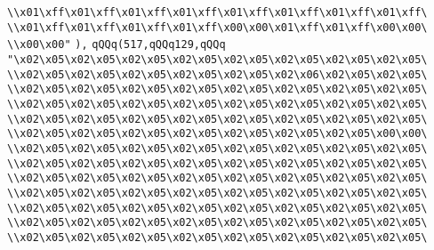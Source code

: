 \verb|\\x01\xff\x01\xff\x01\xff\x01\xff\x01\xff\x01\xff\x01\xff\x01\xff\|\newline
\verb|\\x01\xff\x01\xff\x01\xff\x01\xff\x00\x00\x01\xff\x01\xff\x00\x00\|\newline
\verb|\\x00\x00"|\newline
\verb|),|\newline
\verb|qQQq(517,qQQq129,qQQq|\newline
\verb|"\x02\x05\x02\x05\x02\x05\x02\x05\x02\x05\x02\x05\x02\x05\x02\x05\|\newline
\verb|\\x02\x05\x02\x05\x02\x05\x02\x05\x02\x05\x02\x06\x02\x05\x02\x05\|\newline
\verb|\\x02\x05\x02\x05\x02\x05\x02\x05\x02\x05\x02\x05\x02\x05\x02\x05\|\newline
\verb|\\x02\x05\x02\x05\x02\x05\x02\x05\x02\x05\x02\x05\x02\x05\x02\x05\|\newline
\verb|\\x02\x05\x02\x05\x02\x05\x02\x05\x02\x05\x02\x05\x02\x05\x02\x05\|\newline
\verb|\\x02\x05\x02\x05\x02\x05\x02\x05\x02\x05\x02\x05\x02\x05\x00\x00\|\newline
\verb|\\x02\x05\x02\x05\x02\x05\x02\x05\x02\x05\x02\x05\x02\x05\x02\x05\|\newline
\verb|\\x02\x05\x02\x05\x02\x05\x02\x05\x02\x05\x02\x05\x02\x05\x02\x05\|\newline
\verb|\\x02\x05\x02\x05\x02\x05\x02\x05\x02\x05\x02\x05\x02\x05\x02\x05\|\newline
\verb|\\x02\x05\x02\x05\x02\x05\x02\x05\x02\x05\x02\x05\x02\x05\x02\x05\|\newline
\verb|\\x02\x05\x02\x05\x02\x05\x02\x05\x02\x05\x02\x05\x02\x05\x02\x05\|\newline
\verb|\\x02\x05\x02\x05\x02\x05\x02\x05\x02\x05\x02\x05\x02\x05\x02\x05\|\newline
\verb|\\x02\x05\x02\x05\x02\x05\x02\x05\x02\x05\x02\x05\x02\x05\x02\x05\|\newline
